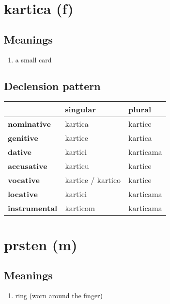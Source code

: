 \filbreak
\section{kartica (f)}
\subsection*{Meanings}
\begin{enumerate}
\item a small card
\end{enumerate}
\subsection*{Declension pattern}
\begin{tabularx}{\linewidth}{Xll}
\toprule
{} &           singular &     plural \\
\midrule
\textbf{nominative  } &            kartica &    kartice \\
\textbf{genitive    } &            kartice &    kartica \\
\textbf{dative      } &            kartici &  karticama \\
\textbf{accusative  } &            karticu &    kartice \\
\textbf{vocative    } &  kartice / kartico &    kartice \\
\textbf{locative    } &            kartici &  karticama \\
\textbf{instrumental} &           karticom &  karticama \\
\bottomrule
\end{tabularx}

\filbreak
\section{prsten (m)}
\subsection*{Meanings}
\begin{enumerate}
\item ring (worn around the finger)
\end{enumerate}
